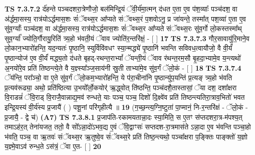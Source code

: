 \documentclass[17pt]{extarticle}
\begin{document}
                  \newline
                                \textbf{ TS 7.3.7.2} \newline
                  र्द॑हन्ते पञ्चदशरा॒त्रेणौजो॒ बल॑मिन्द्रि॒यं ॅवी॒र्य॑मा॒त्मन् द॑धत ए॒ता ए॒व प॑श॒व्याः᳚ पञ्च॑दश॒ वा अ॑र्द्धमा॒सस्य॒ रात्र॑योऽर्द्धमास॒शः सं॑ॅवथ्स॒र आ᳚प्यते संॅवथ्स॒रं प॒शवोऽनु॒ प्र जा॑यन्ते॒ तस्मा᳚त् पश॒व्या॑ ए॒ता ए॒व सु॑व॒र्ग्याः᳚ पञ्च॑दश॒ वा अ॑र्द्धमा॒सस्य॒ रात्र॑योऽर्द्धमास॒शः सं॑ॅवथ्स॒र आ᳚प्यते संॅवथ्स॒रः सु॑व॒र्गो लो॒कस्तस्मा᳚थ् सुव॒र्ग्या᳚ ज्योति॒र्गौरायु॒रिति॑ त्र्य॒हो भ॑वती॒यं ॅवाव ज्योति॑र॒न्तरि॑क्षं॒ - [  ] \textbf{  17} \newline
                  \newline
                                \textbf{ TS 7.3.7.3} \newline
                  गौर॒सावायु॑रि॒माने॒व लो॒कान॒भ्यारो॑हन्ति॒ यद॒न्यतः॑ पृ॒ष्ठानि॒ स्युर्विवि॑वधꣳ स्या॒न्मद्ध्ये॑ पृ॒ष्ठानि॑ भवन्ति सविवध॒त्वायौजो॒ वै वी॒र्यं॑ पृ॒ष्ठान्योज॑ ए॒व वी॒र्यं॑ मद्ध्य॒तो द॑धते बृहद्-रथन्त॒राभ्यां᳚ ॅयन्ती॒यं ॅवाव र॑थन्त॒रम॒सौ बृ॒हदा॒भ्यामे॒व य॒न्त्यथो॑ अ॒नयो॑रे॒व प्रति॑ तिष्ठन्त्ये॒ते वै य॒ज्ञ्स्या᳚ञ्ज॒साय॑नी स्रु॒ती ताभ्या॑मे॒व सु॑व॒र्गं ॅलो॒कं - [  ] \textbf{  18} \newline
                  \newline
                                \textbf{ TS 7.3.7.4} \newline
                  ॅय॑न्ति॒ परा᳚ञ्चो॒ वा ए॒ते सु॑व॒र्गं ॅलो॒कम॒भ्यारो॑हन्ति॒ ये प॑रा॒चीना॑नि पृ॒ष्ठान्यु॑प॒यन्ति॑ प्र॒त्यङ् त्र्य॒हो भ॑वति प्र॒त्यव॑रूढ्या॒ अथो॒ प्रति॑ष्ठित्या उ॒भयो᳚र्लो॒कयोर्॑ ऋ॒द्ध्वोत् ति॑ष्ठन्ति॒ पञ्च॑दशै॒तास्तासां॒ ॅया दश॒ दशा᳚क्षरा वि॒राडन्नं॑ ॅवि॒राड् वि॒राजै॒वान्नाद्य॒मव॑ रुन्धते॒ याः पञ्च॒ पञ्च॒ दिशो॑ दि॒क्ष्वे॑व प्रति॑ तिष्ठन्त्यतिरा॒त्राव॒भितो॑ भवत इन्द्रि॒यस्य॑ वी॒र्य॑स्य प्र॒जायै॑ ( ) पशू॒नां परि॑गृहीत्यै ॥ \textbf{  19 } \newline
                  \newline
                      (ग॒च्छ॒न्त्य॒ग्नि॒ष्टुता॑ पा॒प्मानं॒ नि-र॒न्तरि॑क्षं - ॅलो॒कं - प्र॒जायै॒ - द्वे च॑)  \textbf{(A7)} \newline \newline
                                        \textbf{ TS 7.3.8.1} \newline
                  प्र॒जाप॑ति-रकामयतान्ना॒दः स्या॒मिति॒ स ए॒तꣳ स॑प्तदशरा॒त्र-म॑पश्य॒त् तमाऽह॑र॒त् तेना॑यजत॒ ततो॒ वै सो᳚ऽन्ना॒दो॑ऽभव॒द्य ए॒वं ॅवि॒द्वाꣳसः॑ सप्तदश-रा॒त्रमास॑ते ऽन्ना॒दा ए॒व भ॑वन्ति पञ्चा॒हो भ॑वति॒ पञ्च॒ वा ऋ॒तवः॑ संॅवथ्स॒र ऋ॒तुष्वे॒व सं॑ॅवथ्स॒रे प्रति॑ तिष्ठ॒न्त्यथो॒ पञ्चा᳚क्षरा प॒ङ्क्तिः पाङ्क्तो॑ य॒ज्ञो य॒ज्ञ्मे॒वाऽव॑ रुन्ध॒ते ऽस॑त्रं॒ ॅवा ए॒त- [  ] \textbf{  20} \newline
\end{document}
